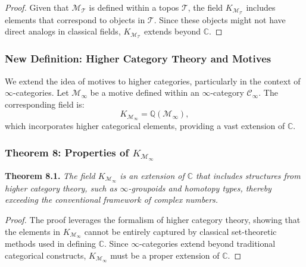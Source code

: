 \documentclass{article}
\begin{document}
\begin{proof}
Given that \(\mathcal{M}_{\mathcal{T}}\) is defined within a topos \(\mathcal{T}\), the field \(K_{\mathcal{M}_{\mathcal{T}}}\) includes elements that correspond to objects in \(\mathcal{T}\). Since these objects might not have direct analogs in classical fields, \(K_{\mathcal{M}_{\mathcal{T}}}\) extends beyond \(\mathbb{C}\).
\end{proof}

\subsubsection{New Definition: Higher Category Theory and Motives}
We extend the idea of motives to higher categories, particularly in the context of \(\infty\)-categories. Let \(\mathcal{M}_{\infty}\) be a motive defined within an \(\infty\)-category \(\mathcal{C}_{\infty}\). The corresponding field is:
\[
K_{\mathcal{M}_{\infty}} = \mathbb{Q}(\mathcal{M}_{\infty}),
\]
which incorporates higher categorical elements, providing a vast extension of \(\mathbb{C}\).

\subsubsection{Theorem 8: Properties of \(K_{\mathcal{M}_{\infty}}\)}
\textbf{Theorem 8.1.} \textit{The field \(K_{\mathcal{M}_{\infty}}\) is an extension of \(\mathbb{C}\) that includes structures from higher category theory, such as \(\infty\)-groupoids and homotopy types, thereby exceeding the conventional framework of complex numbers.}

\begin{proof}
The proof leverages the formalism of higher category theory, showing that the elements in \(K_{\mathcal{M}_{\infty}}\) cannot be entirely captured by classical set-theoretic methods used in defining \(\mathbb{C}\). Since \(\infty\)-categories extend beyond traditional categorical constructs, \(K_{\mathcal{M}_{\infty}}\) must be a proper extension of \(\mathbb{C}\).
\end{proof}
\end{document}
